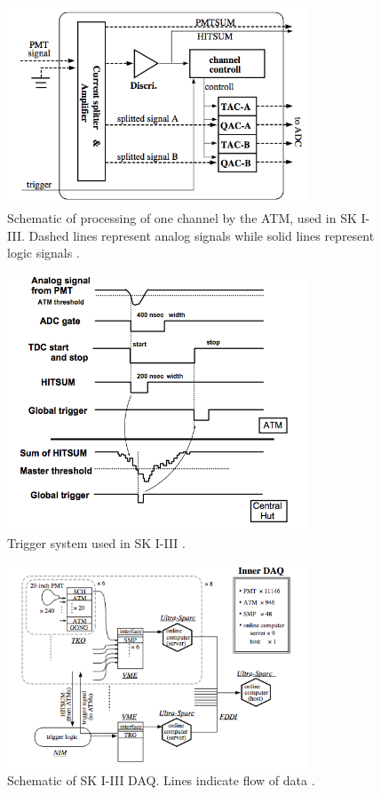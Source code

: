 \begin{figure}
\centering
\includegraphics[width=0.8\textwidth]{figures/SK_1_3_ATM.png}
\caption{Schematic of processing of one channel by the ATM, used in SK I-III.  Dashed lines represent analog signals while solid lines represent logic signals \cite{Fukuda:2002uc}.}
\label{fig:daq_ATM}
\end{figure}

\begin{figure}
\centering
\includegraphics[width=0.8\textwidth]{figures/ID_trigger_SK1_3_Nishino.png}
\caption{Trigger system used in SK I-III \cite{Nishino:2009lps}.}
\label{fig:daq_trigger_1_3}
\end{figure}

\begin{figure}
\centering
\includegraphics[width=0.8\textwidth]{figures/SK_1_3_daq.png}
\caption{Schematic of SK I-III DAQ.  Lines indicate flow of data \cite{Fukuda:2002uc}.}
\label{fig:daq_trigger_1_3}
\end{figure}

